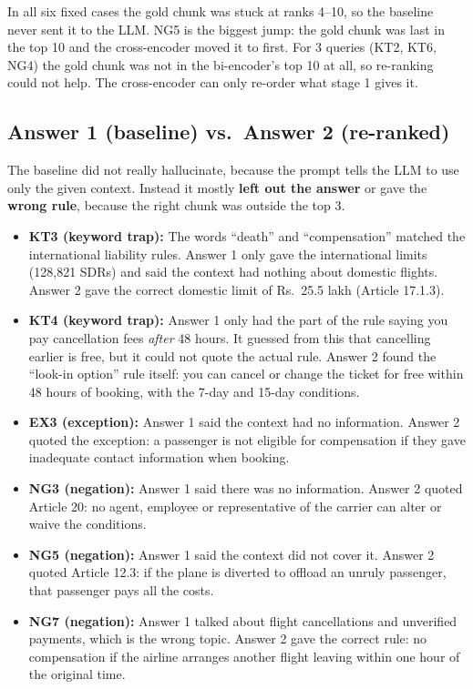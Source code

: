 \documentclass[11pt,a4paper]{article}
\begin{document}
In all six fixed cases the gold chunk was stuck at ranks 4--10, so the baseline never sent it to the LLM. NG5 is the
biggest jump: the gold chunk was last in the top 10 and the cross-encoder moved it to first. For 3 queries (KT2,
KT6, NG4) the gold chunk was not in the bi-encoder's top 10 at all, so re-ranking could not help. The cross-encoder
can only re-order what stage 1 gives it.

\subsection*{Answer 1 (baseline) vs.\ Answer 2 (re-ranked)}

The baseline did not really hallucinate, because the prompt tells the LLM to use only the given context. Instead it
mostly \textbf{left out the answer} or gave the \textbf{wrong rule}, because the right chunk was outside the top 3.

\begin{itemize}
  \item \textbf{KT3 (keyword trap):} The words ``death'' and ``compensation'' matched the international liability
        rules. Answer 1 only gave the international limits (128,821 SDRs) and said the context had nothing about
        domestic flights. Answer 2 gave the correct domestic limit of Rs.\ 25.5 lakh (Article 17.1.3).
  \item \textbf{KT4 (keyword trap):} Answer 1 only had the part of the rule saying you pay cancellation fees
        \emph{after} 48 hours. It guessed from this that cancelling earlier is free, but it could not quote the
        actual rule. Answer 2 found the ``look-in option'' rule itself: you can cancel or change the ticket for
        free within 48 hours of booking, with the 7-day and 15-day conditions.
  \item \textbf{EX3 (exception):} Answer 1 said the context had no information. Answer 2 quoted the exception:
        a passenger is not eligible for compensation if they gave inadequate contact information when booking.
  \item \textbf{NG3 (negation):} Answer 1 said there was no information. Answer 2 quoted Article 20: no agent,
        employee or representative of the carrier can alter or waive the conditions.
  \item \textbf{NG5 (negation):} Answer 1 said the context did not cover it. Answer 2 quoted Article 12.3: if the
        plane is diverted to offload an unruly passenger, that passenger pays all the costs.
  \item \textbf{NG7 (negation):} Answer 1 talked about flight cancellations and unverified payments, which is the
        wrong topic. Answer 2 gave the correct rule: no compensation if the airline arranges another flight
        leaving within one hour of the original time.
\end{itemize}
\end{document}
